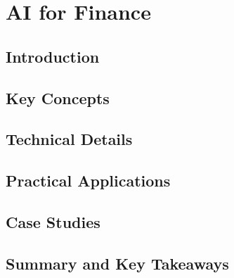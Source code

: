 ﻿%

\chapter{AI for Finance}
\label{ch:chapter-20}

\section{Introduction}


\section{Key Concepts}


\section{Technical Details}


\section{Practical Applications}


\section{Case Studies}


\section{Summary and Key Takeaways}


